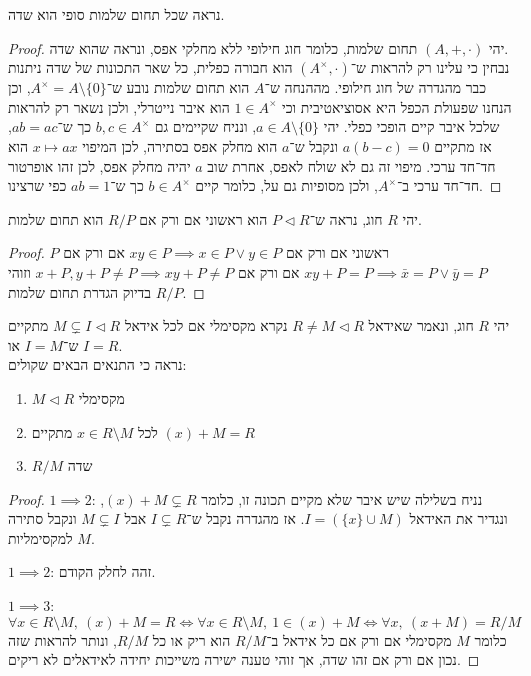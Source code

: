 \question{}
נראה שכל תחום שלמות סופי הוא שדה.
\begin{proof}
	יהי $(A, +, \cdot)$ תחום שלמות, כלומר חוג חילופי ללא מחלקי אפס, ונראה שהוא שדה. \\
	נבחין כי עלינו רק להראות ש־$(A^\times, \cdot)$ הוא חבורה כפלית, כל שאר התכונות של שדה ניתנות כבר מהגדרה של חוג חילופי.
	מההנחה ש־$A$ הוא תחום שלמות נובע ש־$A^\times = A \setminus \{ 0 \}$, וכן הנחנו שפעולת הכפל היא אסוציאטיבית וכי $1 \in A^\times$ הוא איבר נייטרלי, ולכן נשאר רק להראות שלכל איבר קיים הופכי כפלי.
	יהי $a \in A \setminus \{ 0 \}$, ונניח שקיימים גם $b, c \in A^\times$ כך ש־$a b = a c$, אז מתקיים $a (b - c) = 0$ ונקבל ש־$a$ הוא מחלק אפס בסתירה, לכן המיפוי $x \mapsto a x$ הוא חד־חד ערכי.
	מיפוי זה גם לא שולח לאפס, אחרת שוב $a$ יהיה מחלק אפס, לכן זהו אופרטור חד־חד ערכי ב־$A^\times$, ולכן מסופיות גם על, כלומר קיים $b \in A^\times$ כך ש־$a b = 1$ כפי שרצינו.
\end{proof}

\question{}
יהי $R$ חוג,
נראה ש־$P \triangleleft R$ הוא ראשוני אם ורק אם $R / P$ הוא תחום שלמות.
\begin{proof}
	$P$ ראשוני אם ורק אם $x y \in P \implies x \in P \lor y \in P$ אם ורק אם $x y + P = P \implies \bar{x} = P \lor \bar{y} = P$ אם ורק אם $x + P, y + P \ne P \implies x y + P \ne P$ וזוהי בדיוק הגדרת תחום שלמות $R / P$.
\end{proof}

\question{}
יהי $R$ חוג, ונאמר שאידאל $R \ne M \triangleleft R$ נקרא מקסימלי אם לכל אידאל $M \subsetneq I \triangleleft R$ מתקיים ש־$I = M$ או $I = R$. \\
נראה כי התנאים הבאים שקולים:
\begin{enumerate}
	\item $M \triangleleft R$ מקסימלי
	\item לכל $x \in R \setminus M$ מתקיים $(x) + M = R$
	\item $R / M$ שדה
\end{enumerate}
\begin{proof}
	$1 \implies 2$:
	נניח בשלילה שיש איבר שלא מקיים תכונה זו, כלומר $(x) + M \subsetneq R$, ונגדיר את האידאל $I = (\{ x \} \cup M)$.
	אז מהגדרה נקבל ש־$I \subsetneq R$ אבל $M \subsetneq I$ ונקבל סתירה למקסימליות $M$.

	$1 \implies 2$:
	זהה לחלק הקודם.

	$1 \implies 3$:
	\[
		\forall x \in R \setminus M,\ (x) + M = R
		\iff \forall x \in R \setminus M,\ 1 \in (x) + M
		\iff \forall x,\ (x + M) = R / M
	\]
	כלומר $M$ מקסימלי אם ורק אם כל אידאל ב־$R / M$ הוא ריק או כל $R / M$, ונותר להראות שזה נכון אם ורק אם זהו שדה, אך זוהי טענה ישירה משייכות יחידה לאידאלים לא ריקים.
\end{proof}

